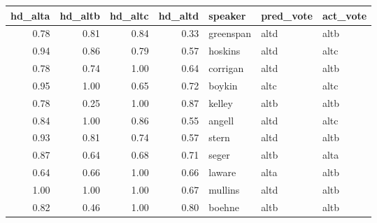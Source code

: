 \begin{tabular}{rrrrlll}
\toprule
 hd\_alta &  hd\_altb &  hd\_altc &  hd\_altd &    speaker & pred\_vote & act\_vote \\
\midrule
    0.78 &     0.81 &     0.84 &     0.33 &  greenspan &      altd &     altb \\
    0.94 &     0.86 &     0.79 &     0.57 &    hoskins &      altd &     altc \\
    0.78 &     0.74 &     1.00 &     0.64 &   corrigan &      altd &     altb \\
    0.95 &     1.00 &     0.65 &     0.72 &     boykin &      altc &     altc \\
    0.78 &     0.25 &     1.00 &     0.87 &     kelley &      altb &     altb \\
    0.84 &     1.00 &     0.86 &     0.55 &     angell &      altd &     altc \\
    0.93 &     0.81 &     0.74 &     0.57 &      stern &      altd &     altb \\
    0.87 &     0.64 &     0.68 &     0.71 &      seger &      altb &     alta \\
    0.64 &     0.66 &     1.00 &     0.66 &     laware &      alta &     altb \\
    1.00 &     1.00 &     1.00 &     0.67 &    mullins &      altd &     altb \\
    0.82 &     0.46 &     1.00 &     0.80 &     boehne &      altb &     altb \\
\bottomrule
\end{tabular}
